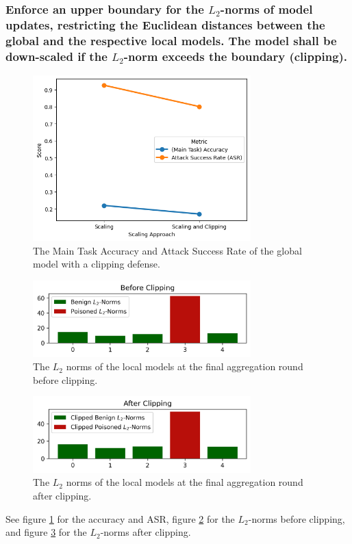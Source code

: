 \documentclass{article}
\begin{document}
\subsubsection{Enforce an upper boundary for the $L_2$-norms of model updates, restricting the Euclidean distances between the global and the respective local
models. The model shall be down-scaled if the $L_2$-norm exceeds the boundary (clipping).}
\begin{figure}
    \centering
    \includegraphics[width=0.75\textwidth]{clipping_defense.png}
    \caption{The Main Task Accuracy and Attack Success Rate of the global model with a clipping defense.}
    \label{fig:clipping_defense}
\end{figure}

\begin{figure}
    \centering
    \includegraphics[width=0.75\textwidth]{before_clipping.png}
    \caption{The $L_2$ norms of the local models at the final aggregation round before clipping.}
    \label{fig:before_clipping}
\end{figure}

\begin{figure}
    \centering
    \includegraphics[width=0.75\textwidth]{after_clipping.png}
    \caption{The $L_2$ norms of the local models at the final aggregation round after clipping.}
    \label{fig:after_clipping}
\end{figure}
See figure \ref{fig:clipping_defense} for the accuracy and ASR, figure \ref{fig:before_clipping} for the $L_2$-norms before clipping, and figure \ref{fig:after_clipping} for the $L_2$-norms after clipping.
\end{document}

